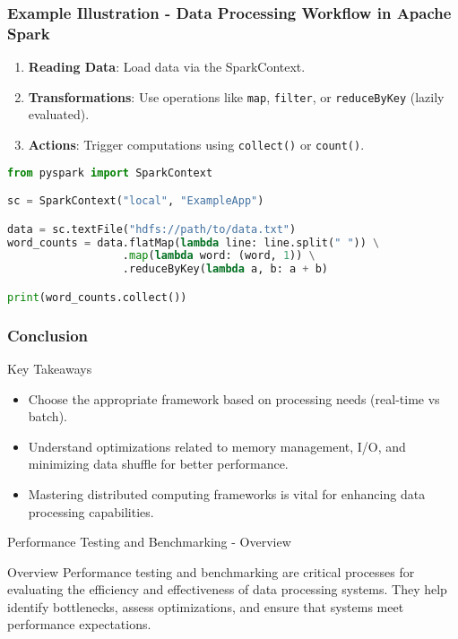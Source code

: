 \documentclass[aspectratio=169]{beamer}
\begin{document}
\begin{frame}[fragile]
    \frametitle{Example Illustration - Data Processing Workflow in Apache Spark}
    \begin{enumerate}
        \item \textbf{Reading Data}: Load data via the SparkContext.
        \item \textbf{Transformations}: Use operations like \texttt{map}, \texttt{filter}, or \texttt{reduceByKey} (lazily evaluated).
        \item \textbf{Actions}: Trigger computations using \texttt{collect()} or \texttt{count()}.
    \end{enumerate}
    \begin{lstlisting}[language=Python]
from pyspark import SparkContext

sc = SparkContext("local", "ExampleApp")

data = sc.textFile("hdfs://path/to/data.txt")
word_counts = data.flatMap(lambda line: line.split(" ")) \
                  .map(lambda word: (word, 1)) \
                  .reduceByKey(lambda a, b: a + b)

print(word_counts.collect())
    \end{lstlisting}
\end{frame}

\begin{frame}[fragile]
    \frametitle{Conclusion}
    \begin{block}{Key Takeaways}
        \begin{itemize}
            \item Choose the appropriate framework based on processing needs (real-time vs batch).
            \item Understand optimizations related to memory management, I/O, and minimizing data shuffle for better performance.
            \item Mastering distributed computing frameworks is vital for enhancing data processing capabilities.
        \end{itemize}
    \end{block}
\end{frame}

\begin{frame}[fragile]{Performance Testing and Benchmarking - Overview}
  \begin{block}{Overview}
    Performance testing and benchmarking are critical processes for evaluating the efficiency and effectiveness of data processing systems. They help identify bottlenecks, assess optimizations, and ensure that systems meet performance expectations.
  \end{block}
\end{frame}
\end{document}
